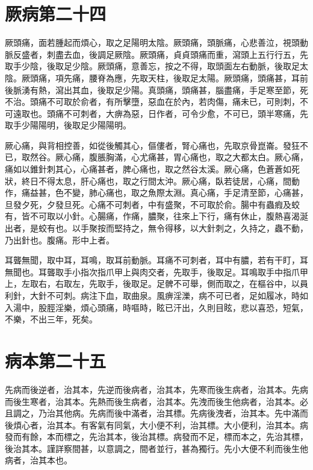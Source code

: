 \section{厥病第二十四}

厥頭痛，面若腫起而煩心，取之足陽明太陰。厥頭痛，頭脈痛，心悲善泣，視頭動脈反盛者，刺盡去血，後調足厥陰。厥頭痛，貞貞頭痛而重，瀉頭上五行行五，先取手少陰，後取足少陰。厥頭痛，意善忘，按之不得，取頭面左右動脈，後取足太陰。厥頭痛，項先痛，腰脊為應，先取天柱，後取足太陽。厥頭痛，頭痛甚，耳前後脈湧有熱，瀉出其血，後取足少陽。真頭痛，頭痛甚，腦盡痛，手足寒至節，死不治。頭痛不可取於俞者，有所擊墮，惡血在於內，若肉傷，痛未已，可則刺，不可遠取也。頭痛不可刺者，大痹為惡，日作者，可令少愈，不可已，頭半寒痛，先取手少陽陽明，後取足少陽陽明。

厥心痛，與背相控善，如從後觸其心，傴僂者，腎心痛也，先取京骨崑崙。發狂不已，取然谷。厥心痛，腹脹胸滿，心尤痛甚，胃心痛也，取之大都太白。厥心痛，痛如以錐針刺其心，心痛甚者，脾心痛也，取之然谷太溪。厥心痛，色蒼蒼如死狀，終日不得太息，肝心痛也，取之行間太沖。厥心痛，臥若徒居，心痛，間動作，痛益甚，色不變，肺心痛也，取之魚際太淵。真心痛，手足清至節，心痛甚，旦發夕死，夕發旦死。心痛不可刺者，中有盛聚，不可取於俞。腸中有蟲瘕及蛟有，皆不可取以小針。心腸痛，作痛，膿聚，往來上下行，痛有休止，腹熱喜渴涎出者，是蛟有也。以手聚按而堅持之，無令得移，以大針刺之，久持之，蟲不動，乃出針也。腹痛。形中上者。

耳聾無聞，取中耳，耳鳴，取耳前動脈。耳痛不可刺者，耳中有膿，若有干盯，耳無聞也。耳聾取手小指次指爪甲上與肉交者，先取手，後取足。耳鳴取手中指爪甲上，左取右，右取左，先取手，後取足。足髀不可舉，側而取之，在樞谷中，以員利針，大針不可刺。病注下血，取曲泉。風痹淫濼，病不可已者，足如履冰，時如入湯中，股脛淫樂，煩心頭痛，時嘔時，眩已汗出，久則目眩，悲以喜恐，短氣，不樂，不出三年，死矣。



\section{病本第二十五}

先病而後逆者，治其本，先逆而後病者，治其本，先寒而後生病者，治其本。先病而後生寒者，治其本。先熱而後生病者，治其本。先洩而後生他病者，治其本。必且調之，乃治其他病。先病而後中滿者，治其標。先病後洩者，治其本。先中滿而後煩心者，治其本。有客氣有同氣，大小便不利，治其標。大小便利，治其本。病發而有餘，本而標之，先治其本，後治其標。病發而不足，標而本之，先治其標，後治其本。謹詳察間甚，以意調之，間者並行，甚為獨行。先小大便不利而後生他病者，治其本也。



